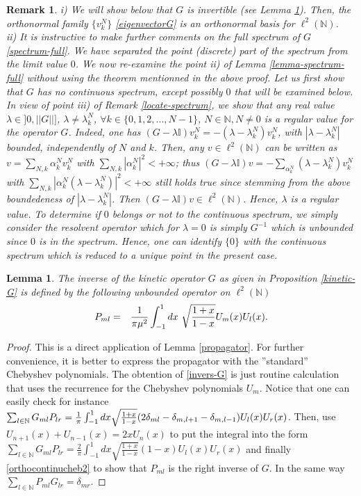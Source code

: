 \documentclass[a4paper,11pt,twoside]{article}
\numberwithin{equation}{section}
\newcommand\bbone{{ \mathbb{I}}}
\newtheorem{lemma}[Theorem]{Lemma}
\newtheorem{remark}[Theorem]{Remark}
\theoremstyle{nonumberplain}
\newtheorem{proof}{Proof}
\newcounter{and}
\begin{document}
\begin{remark}
i) We will show below that $G$ is invertible (see Lemma \ref{propagator-spectform}). Then, the orthonormal family $\{v^N_k \}$ \eqref{eigenvectorG} is an orthonormal basis for $\ell^2(\mathbb{N})$. \\
ii) It is instructive to make further comments on the full spectrum of $G$ \eqref{spectrum-full}. We have separated the point (discrete) part of the spectrum from the limit value $0$. We now re-examine the point ii) of Lemma \ref{lemma-spectrum-full} without using the theorem mentionned in the above proof. Let us first show that $G$ has no continuous spectrum, except possibly $0$ that will be examined below. In view of point iii) of Remark \ref{locate-spectrum}, we show that any real value $\lambda\in]0,||G||]$, $\lambda\ne\lambda^N_k$, $\forall k\in\{0,1,2,...,N-1 \}$, $N\in\mathbb{N}, N\ne0$ is a regular value for the operator $G$. Indeed, one has $(G-\lambda\bbone)v^N_k=-(\lambda-\lambda^N_k)v^N_k$, with $|\lambda-\lambda^N_k|$ bounded, independently of $N$ and $k$. Then, any $v\in\ell^2(\mathbb{N})$ can be written as $v=\sum_{N,k}\alpha^N_kv^N_k$ with $\sum_{N,k}|\alpha^N_k|^2<+\infty$; thus $(G-\lambda\bbone)v=-\sum_{\alpha^N_k}(\lambda-\lambda^N_k)v^N_k$ with $\sum_{N,k}|\alpha^N_k(\lambda-\lambda^N_k)
|^2<+\infty$ still holds true since stemming from the above boundedeness of $|\lambda-\lambda^N_k|$. Then $(G-\lambda\bbone)v\in\ell^2(\mathbb{N})$. Hence, $\lambda$ is a regular value. To determine if $0$ belongs or not to the continuous spectrum, we simply consider the resolvent operator which for $\lambda=0$ is simply $G^{-1}$ which is unbounded since $0$ is in the spectrum. Hence, one can identify $\{0\}$ with the continuous spectrum which is reduced to a unique point in the present case.
\end{remark}
\begin{lemma}\label{propagator-spectform}
The inverse of the kinetic operator $G$ as given in Proposition \ref{kinetic-G} is defined by the following unbounded operator on $\ell^2(\mathbb{N})$
\begin{eqnarray}
P_{ml}&=&{{1}\over{\pi\mu^2}}\int_{-1}^1dx\ {\sqrt{{{1+x }\over{ 1-x}}}}U_m(x)U_l(x)\label{invers-G}.
\end{eqnarray}
\end{lemma}
\begin{proof}
This is a direct application of Lemma \ref{propagator}. For further convenience, it is better to express the propagator with the ''standard'' Chebyshev polynomials. The obtention of \eqref{invers-G} is just routine calculation that uses the recurrence for the Chebyshev polynomials $U_m$. Notice that one can easily check for instance $\sum_{l\in\mathbb{N}}G_{ml}P_{lr}={{1}\over{\pi}}\int_{-1}^1dx{\sqrt{\frac{1+x}{1-x}}}(2\delta_{ml}-\delta_{m,l+1}-\delta_{m,l-1})U_l(x)U_r(x)$. Then, use $U_{n+1}(x)+U_{n-1}(x)=2xU_n(x)$ to put the integral into the form $\sum_{l\in\mathbb{N}}G_{ml}P_{lr}=\frac{2}{\pi}\int_{-1}^1dx{\sqrt{\frac{1+x}{1-x}}}(1-x)U_l(x)U_r(x)$ and finally \eqref{orthocontinucheb2} to show that $P_{ml}$ is the right inverse of $G$. In the same way $\sum_{l\in\mathbb{N}}P_{ml}G_{lr}=\delta_{mr}$.
\end{proof}
\end{document}
